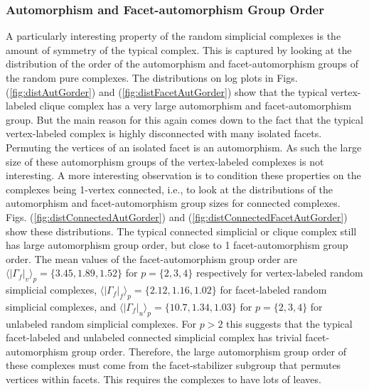 \documentclass[12pt]{article}
\theoremstyle{plain}
\theoremstyle{definition}
\theoremstyle{remark}
\begin{document}
\subsubsection{Automorphism and  Facet-automorphism Group Order}
A particularly interesting property of the random simplicial complexes is the amount of symmetry of the typical complex. This is captured by looking at the distribution of the order of the automorphism and facet-automorphism groups of the random pure complexes. The distributions on log plots in Figs.(\ref{fig:distAutGorder}) and (\ref{fig:distFacetAutGorder}) show that the typical vertex-labeled clique complex has a very large automorphism and facet-automorphism group. But the main reason for this again comes down to the fact that the typical vertex-labeled complex is highly disconnected with  many isolated facets. Permuting the vertices of an isolated facet is an automorphism. As such the large size of these automorphism groups of the vertex-labeled complexes is not interesting. A more interesting observation is to condition these properties on the complexes being 1-vertex connected, i.e., to look at the distributions of the automorphism and facet-automorphism group sizes for connected complexes. Figs. (\ref{fig:distConnectedAutGorder}) and (\ref{fig:distConnectedFacetAutGorder}) show these distributions. The typical connected simplicial or clique complex still has large automorphism group order, but close to 1 facet-automorphism group order. The mean values of the facet-automorphism group order are $\langle|\Gamma_f|_v \rangle_{p}=\{3.45, 1.89,1.52\}$ for $p=\{2,3,4\}$ respectively for vertex-labeled random simplicial complexes, $\langle|\Gamma_f|_f \rangle_{p}=\{2.12, 1.16, 1.02\}$ for facet-labeled random simplicial complexes, and $\langle|\Gamma_f|_u \rangle_{p}=\{10.7, 1.34, 1.03\}$ for $p=\{2,3,4\}$ for unlabeled random simplicial complexes. For $p>2$ this suggests that the typical facet-labeled and unlabeled connected simplicial complex has trivial facet-automorphism group order. Therefore, the large automorphism group order of these complexes  must come from the facet-stabilizer subgroup that permutes vertices within facets. This requires the complexes to have lots of leaves.    
\end{document}
